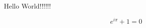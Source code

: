 \documentclass{article}
\begin{document}
Hello World!!!!!!

\begin{equation}
    e^{i\pi} + 1 = 0
\end{equation}
\end{document}
